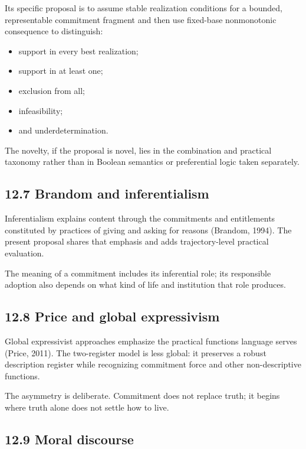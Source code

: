 \documentclass[
  11pt,
]{article}
\providecommand{\tightlist}{%
  \setlength{\itemsep}{0pt}\setlength{\parskip}{0pt}}
\begin{document}
Its specific proposal is to assume stable realization conditions for a
bounded, representable commitment fragment and then use fixed-base
nonmonotonic consequence to distinguish:

\begin{itemize}
\tightlist
\item
  support in every best realization;
\item
  support in at least one;
\item
  exclusion from all;
\item
  infeasibility;
\item
  and underdetermination.
\end{itemize}

The novelty, if the proposal is novel, lies in the combination and
practical taxonomy rather than in Boolean semantics or preferential
logic taken separately.

\subsection{12.7 Brandom and
inferentialism}\label{brandom-and-inferentialism}

Inferentialism explains content through the commitments and entitlements
constituted by practices of giving and asking for reasons (Brandom,
1994). The present proposal shares that emphasis and adds
trajectory-level practical evaluation.

The meaning of a commitment includes its inferential role; its
responsible adoption also depends on what kind of life and institution
that role produces.

\subsection{12.8 Price and global
expressivism}\label{price-and-global-expressivism}

Global expressivist approaches emphasize the practical functions
language serves (Price, 2011). The two-register model is less global: it
preserves a robust description register while recognizing commitment
force and other non-descriptive functions.

The asymmetry is deliberate. Commitment does not replace truth; it
begins where truth alone does not settle how to live.

\subsection{12.9 Moral discourse}\label{moral-discourse}
\end{document}
